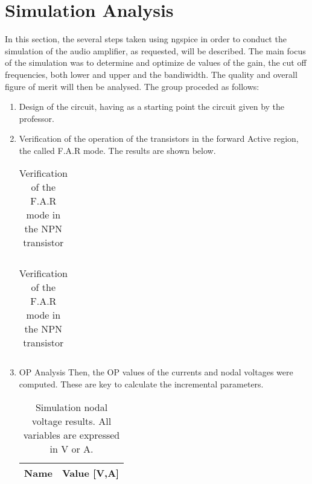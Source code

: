 \section{Simulation Analysis}
\label{section:sim}
 
In this section, the several steps taken using ngspice in order to conduct the simulation of the audio amplifier, as requested, will be described. The main focus of the simulation was to determine and optimize de values of the gain, the cut off frequencies, both lower and upper and the bandiwidth. The quality and overall figure of merit will then be analysed.
The group proceded as follows:

\begin{enumerate}
\item Design of the circuit, having as a starting point the circuit given by the professor.

\item Verification of the operation of the transistors in the forward Active region, the called F.A.R mode. The results are shown below.

\begin{table}[ht]
  \centering
  \begin{tabular}{|l|r|}
    \hline    
   
     \end{tabular}
  \caption{Verification of the F.A.R mode in the NPN transistor}
 
\end{table}


\begin{table}[ht]
  \centering
  \begin{tabular}{|l|r|}
    \hline    
   
     \end{tabular}
  \caption{Verification of the F.A.R mode in the NPN transistor}
    
\end{table}



\item OP Analysis
     Then, the OP values of the currents and nodal voltages were computed. These are key to calculate the incremental parameters.
     
 \begin{table}[ht]

  \centering
  \begin{tabular}{|l|r|}
    \hline    
    {\bf Name} & {\bf Value [V,A]} \\ \hline
    
  \end{tabular}
  \caption{Simulation nodal voltage results. All variables are expressed in V or A.} 
\end{table}
     

\end{enumerate}
